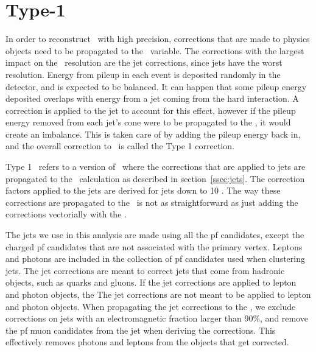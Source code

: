 \section{Type-1 \texorpdfstring{\MET}{MET}}
\label{sec:t1met}
In order to reconstruct \MET\ with high precision, corrections that are made to physics objects need to be propagated to the \MET\ variable.
The corrections with the largest impact on the \MET\ resolution are the jet corrections, since jets have the worst resolution.
Energy from pileup in each event is deposited randomly in the detector, and is expected to be balanced.
It can happen that some pileup energy deposited overlaps with energy from a jet coming from the hard interaction.
A correction is applied to the jet to account for this effect,
however if the pileup energy removed from each jet's cone were to be propagated to the \MET, it would create an imbalance.
This is taken care of by adding the pileup energy back in, and the overall correction to \MET\ is called the Type 1 correction.

Type 1 \MET\ refers to a version of \MET\ where the corrections that are applied to jets are propagated to the \MET\ calculation as described in section~\ref{ssec:jets}.
The correction factors applied to the jets are derived for jets down to 10 \gev.
The way these corrections are propagated to the \MET\ is not as straightforward as just adding the corrections vectorially with the \MET.

The jets we use in this analysis are made using all the pf candidates, except the charged pf candidates that are not associated with the primary vertex.
Leptons and photons are included in the collection of pf candidates used when clustering jets.
The jet corrections are meant to correct jets that come from hadronic objects, such as quarks and gluons.
If the jet corrections are applied to lepton and photon objects, the
The jet corrections are not meant to be applied to lepton and photon objects.
When propagating the jet corrections to the \MET, we exclude corrections on jets with an electromagnetic fraction larger than 90\%,
and remove the pf muon candidates from the jet when deriving the corrections.
This effectively removes photons and leptons from the objects that get corrected.

